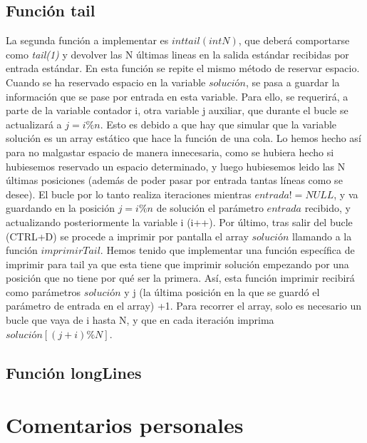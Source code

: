 \section{Función tail}
La segunda función a implementar es $int tail(int N)$, que deberá comportarse como \textit{tail(1)} y devolver las N últimas lineas en la salida estándar recibidas por entrada estándar.
En esta función se repite el mismo método de reservar espacio. Cuando se ha reservado espacio en la variable $solución$, se pasa a guardar la información que se pase por entrada en esta variable. Para ello, se requerirá, a parte de la variable contador i, otra variable j auxiliar, que durante el bucle se actualizará a $j=i\%n$. Esto es debido a que hay que simular que la variable solución es un array estático que hace la función de una cola. Lo hemos hecho así para no malgastar espacio de manera innecesaria, como se hubiera hecho si hubiesemos reservado un espacio determinado, y luego hubiesemos leido las N últimas posiciones (además de poder pasar por entrada tantas líneas como se desee).
El bucle por lo tanto realiza iteraciones mientras $entrada != NULL$, y va guardando en la posición $j=i\%n$ de solución el parámetro $entrada$ recibido, y actualizando posteriormente la variable i (i++).
Por último, tras salir del bucle (CTRL+D) se procede a imprimir por pantalla el array $solución$ llamando a la función $imprimirTail$. Hemos tenido que implementar una función específica de imprimir para tail ya que esta tiene que imprimir solución empezando por una posición que no tiene por qué ser la primera.
Así, esta función imprimir recibirá como parámetros $solución$ y j (la última posición en la que se guardó el parámetro de entrada en el array) +1. Para recorrer el array, solo es necesario un bucle que vaya de i hasta N, y que en cada iteración imprima $solución[(j+i)\%N]$.
\section{Función longLines}
\chapter{Comentarios personales}
